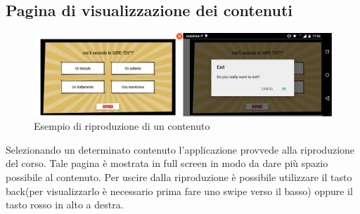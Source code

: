 	\subsection{Pagina di visualizzazione dei contenuti}
	\begin{figure}[H]
		\centering
		\includegraphics[scale=0.1]{images/prodotto_finale/content_tot}
			\caption{Esempio di riproduzione di un contenuto}
	\end{figure}
	Selezionando un determinato contenuto l'applicazione provvede alla riproduzione del corso. Tale pagina è mostrata in full screen in modo da dare più spazio possibile al contenuto. Per uscire dalla riproduzione è possibile utilizzare il tasto back(per visualizzarlo è necessario prima fare uno swipe verso il basso) oppure il tasto rosso in alto a destra.